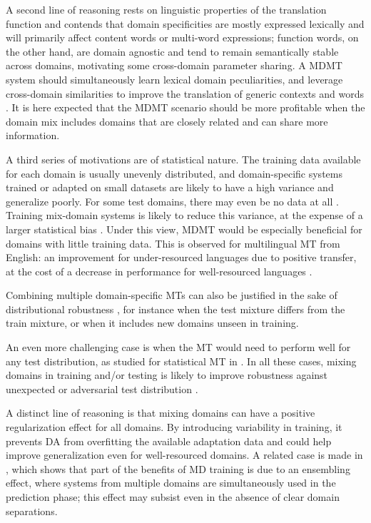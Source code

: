 \documentclass[11pt,a4paper]{article}
\newcommand{\revisiondel}[1]{}
\begin{document}
A second line of reasoning rests on linguistic properties of the translation function and contends that domain specificities are mostly expressed lexically and will primarily affect content words or multi-word expressions; function words, on the other hand, are domain agnostic and tend to remain semantically stable across domains, motivating some cross-domain parameter sharing. A MDMT system should simultaneously learn lexical domain peculiarities, and leverage cross-domain similarities to improve the translation of generic contexts and words \cite{Zeng18multidomain,Pham19generic}. It is here expected that the MDMT scenario should be more profitable when the domain mix includes domains that are closely related and can share more information.

A third series of motivations are of statistical nature. The training data available for each domain is usually unevenly distributed, and domain-specific systems trained or adapted on small datasets are likely to have a high variance and generalize poorly. For some test domains, there may even be no data at all \cite{Farajian17neural}. Training mix-domain systems is likely to reduce this variance, at the expense of a larger statistical bias \cite{Clark12onesystem}. Under this view, MDMT would be especially beneficial for domains with little training data. This is observed for multilingual MT from English: an improvement for under-resourced languages due to positive transfer, at the cost of a decrease in performance for well-resourced languages \cite{Arivazhagan19massively}.

Combining multiple domain-specific MTs can also be justified in the sake of distributional robustness \cite{Mansour09domainadaptation,Mansour09multiple}, for instance when the test mixture differs from the train mixture, or when it includes new domains unseen in training.
\revisiondel{Such scenario is already well documented for zero-shot multilingual MT \cite{Firat16multiway,Ha16towards,Johnson17google,Platanios18contextual} where mixing languages has more than demonstrated its usefulness.}
An even more challenging case is when the MT would need to perform well for any test distribution, as studied for statistical MT in \cite{Huck15mixeddomain}. In all these cases, mixing domains in training and/or testing is likely to improve robustness against unexpected or adversarial test distribution \cite{Oren19distributionally}.

A distinct line of reasoning is that mixing domains can have a positive regularization effect for all domains. By introducing variability in training, it prevents DA from overfitting the available adaptation data and could help improve generalization even for well-resourced domains. A related case is made in \cite{Joshi12multidomain}, which shows that part of the benefits of MD training is due to an ensembling effect, where systems from multiple domains are simultaneously used in the prediction phase; this effect may subsist even in the absence of clear domain separations.
\end{document}
